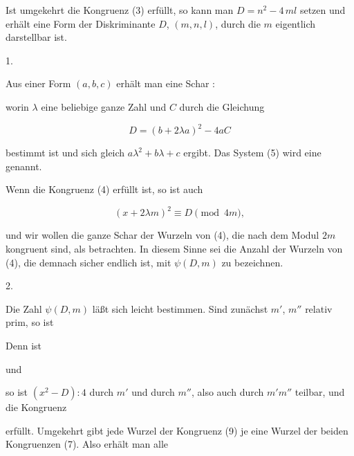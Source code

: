 Ist umgekehrt die Kongruenz (3) erfüllt, so kann man
$D = n^2 - 4\,ml$ setzen und erhält eine Form der Diskriminante $D$,
$(m, n, l)$, durch die $m$ eigentlich darstellbar ist.

1. 



Aus einer Form $(a,b,c)$ erhält man eine Schar :


worin $\lambda$ eine beliebige ganze Zahl und $C$ durch die Gleichung

\[ D = (b+2\lambda a)^2 - 4aC \]

bestimmt ist und sich gleich $a\lambda^2+b\lambda+c$ ergibt. Das System (5)
wird eine  genannt.

Wenn die Kongruenz (4) erfüllt ist, so ist auch

\[ (x+2\lambda m)^2 \equiv D \pmod{4m}, \]

und wir wollen die ganze Schar der Wurzeln von (4), die nach
dem Modul $2m$ kongruent sind, als  betrachten. In
diesem Sinne sei die Anzahl der Wurzeln von (4), die demnach
sicher endlich ist, mit $\psi(D,m)$ zu bezeichnen.

2. 

Die Zahl $\psi(D,m)$ läßt sich leicht bestimmen. Sind zunächst
$m'$, $m''$ relativ prim, so ist


Denn ist


und


so ist $(x^2-D):4$ durch $m'$ und durch $m''$, also auch durch $m'm''$
teilbar, und die Kongruenz


erfüllt. Umgekehrt gibt jede Wurzel der Kongruenz (9) je eine
Wurzel der beiden Kongruenzen (7). Also erhält man alle
